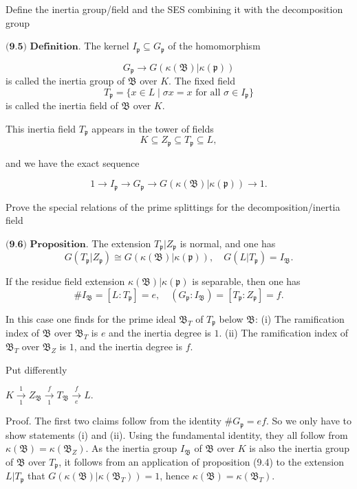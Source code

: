 Define the inertia group/field and the SES combining it with the decomposition group

\( \textbf{(9.5) Definition.} \) 
The kernel \( I_{\mathfrak{p}} \subseteq G_{\mathfrak{p}} \) of the homomorphism

\[
G_{\mathfrak{p}} \longrightarrow G(\kappa(\mathfrak{B})|\kappa(\mathfrak{p}))
\]
is called the inertia group of \(\mathfrak{B}\) over \( K \). The fixed field
\[
T_{\mathfrak{p}} = \{ x \in L \mid \sigma x = x \text{ for all } \sigma \in I_{\mathfrak{p}} \}
\]
is called the inertia field of \(\mathfrak{B}\) over \( K \).

This inertia field \( T_{\mathfrak{p}} \) appears in the tower of fields
\[
K \subseteq Z_{\mathfrak{p}} \subseteq T_{\mathfrak{p}} \subseteq L,
\]

and we have the exact sequence

\[
1 \longrightarrow I_{\mathfrak{p}} \longrightarrow G_{\mathfrak{p}} \longrightarrow G(\kappa(\mathfrak{B})|\kappa(\mathfrak{p})) \longrightarrow 1.
\]


Prove the special relations of the prime splittings for the decomposition/inertia field

\( \textbf{(9.6) Proposition.} \) 
The extension \( T_{\mathfrak{p}} | Z_{\mathfrak{p}} \) is normal, and one has
\[
G(T_{\mathfrak{p}} | Z_{\mathfrak{p}}) \cong G(\kappa(\mathfrak{B})|\kappa(\mathfrak{p})), \quad G(L|T_{\mathfrak{p}}) = I_{\mathfrak{B}}.
\]

If the residue field extension \(\kappa(\mathfrak{B})|\kappa(\mathfrak{p})\) is separable, then one has
\[
\#I_{\mathfrak{B}} = [L : T_{\mathfrak{p}}] = e, \quad (G_{\mathfrak{p}} : I_{\mathfrak{B}}) = [T_{\mathfrak{p}} : Z_{\mathfrak{p}}] = f.
\]

In this case one finds for the prime ideal \(\mathfrak{B}_T\) of \( T_{\mathfrak{p}} \) below \(\mathfrak{B}\):
(i) The ramification index of \(\mathfrak{B}\) over \(\mathfrak{B}_T\) is \( e \) and the inertia degree is \( 1 \).
(ii) The ramification index of \(\mathfrak{B}_T\) over \(\mathfrak{B}_Z\) is \( 1 \), and the inertia degree is \( f \).

Put differently

\( K \xrightarrow[1]{1} Z_\mathfrak{B} \xrightarrow[1]{f} T_\mathfrak{B} \xrightarrow[e]{f} L \).

Proof. The first two claims follow from the identity \( \#G_{\mathfrak{p}} = ef \). So we only have to show statements (i) and (ii). Using the fundamental identity, they all follow from \(\kappa(\mathfrak{B}) = \kappa(\mathfrak{B}_Z)\). As the inertia group \( I_{\mathfrak{B}} \) of \(\mathfrak{B}\) over \( K \) is also the inertia group of \(\mathfrak{B}\) over \( T_{\mathfrak{p}} \), it follows from an application of proposition (9.4) to the extension \( L|T_{\mathfrak{p}} \) that \( G(\kappa(\mathfrak{B})|\kappa(\mathfrak{B}_T)) = 1 \), hence \(\kappa(\mathfrak{B}) = \kappa(\mathfrak{B}_T)\). 


